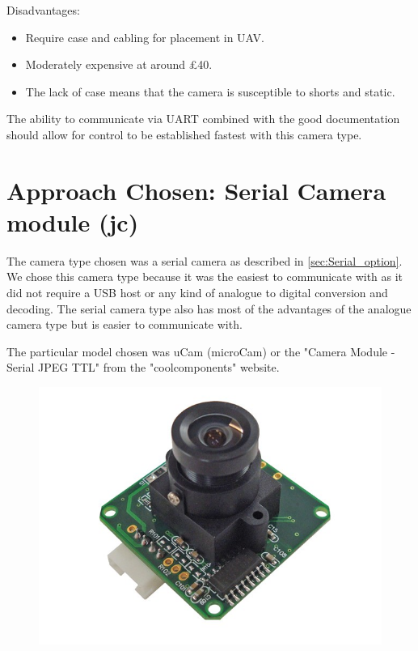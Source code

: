 Disadvantages:
     \begin{itemize}
       	\item Require case and cabling for placement in UAV.
	\item Moderately expensive at around \pounds 40.
       	\item The lack of case means that the camera is susceptible to shorts and static.
     \end{itemize}

The ability to communicate via UART combined with the good documentation should allow for control to be established fastest with this camera type.

\section{Approach Chosen: Serial Camera module (jc)}
\label{sec:John_chosen_options}

The camera type chosen was a serial camera as described in \ref{sec:Serial_option}. We chose this camera type because it was the easiest to communicate with as it did not require a USB host or any kind of analogue to digital conversion and decoding. The serial camera type also has most of the advantages of the analogue camera type but is easier to communicate with.

The particular model chosen was uCam (microCam) or the "Camera Module - Serial JPEG TTL" from the "coolcomponents" website.

\begin{figure}[H]
        \centering
        \includegraphics[width=1.00\textwidth]{figures/uCam.jpg}
        \label{fig:uCam_photo}
\end{figure}

